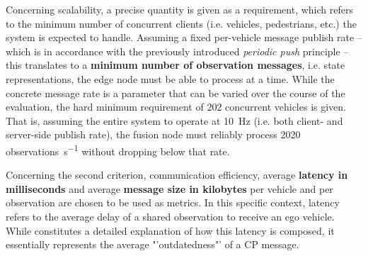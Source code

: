 Concerning scalability, a precise quantity is given as a requirement, which refers to the minimum number of concurrent clients (i.e. vehicles, pedestrians, etc.) the system is expected to handle. Assuming a fixed per-vehicle message publish rate – which is in accordance with the previously introduced \textit{periodic push} principle – this translates to a \textbf{minimum number of observation messages}, i.e. state representations, the edge node must be able to process at a time. While the concrete message rate is a parameter that can be varied over the course of the evaluation, the hard minimum requirement of 202 concurrent vehicles is given. That is, assuming the entire system to operate at \SI{10}{Hz} (i.e. both client- and server-side publish rate), the fusion node must reliably process 2020 \si{observations\per\second} without dropping below that rate.

Concerning the second criterion, communication efficiency, average \textbf{latency in milliseconds} and average \textbf{message size in kilobytes} per vehicle and per observation are chosen to be used as metrics. In this specific context, latency refers to the average delay of a shared observation to receive an ego vehicle. While  constitutes a detailed explanation of how this latency is composed, it essentially represents the average "'outdatedness"' of a CP message.